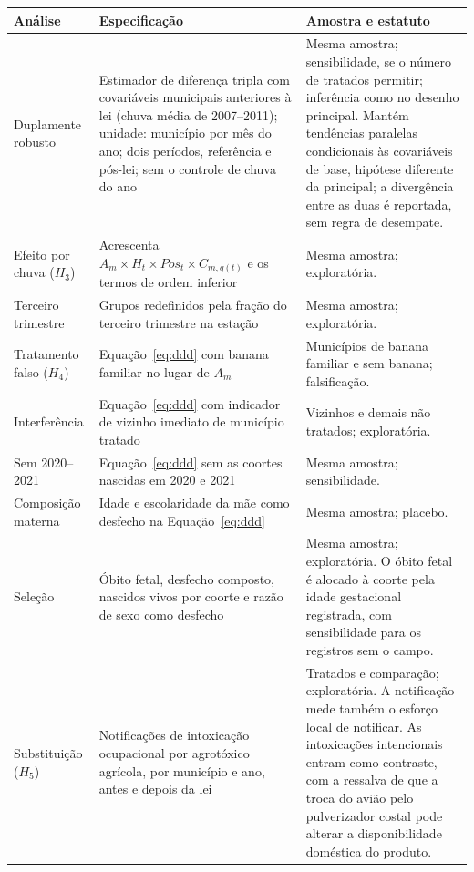 \begin{apendicesenv}
\begin{quadro}[htb]
\caption{\label{qua:espec2}Especificações do desenho de calendário (continuação)}
\centering
\footnotesize
\begin{tabular}{@{}p{3.4cm}p{6.0cm}p{5.1cm}@{}}
\toprule
Análise & Especificação & Amostra e estatuto \\
\midrule
Duplamente robusto & Estimador de diferença tripla com covariáveis municipais anteriores à lei (chuva média de 2007--2011); unidade: município por mês do ano; dois períodos, referência e pós-lei; sem o controle de chuva do ano & Mesma amostra; sensibilidade, se o número de tratados permitir; inferência como no desenho principal. Mantém tendências paralelas condicionais às covariáveis de base, hipótese diferente da principal; a divergência entre as duas é reportada, sem regra de desempate. \\
Efeito por chuva ($H_3$) & Acrescenta $A_m \times H_t \times Pos_t \times C_{m,q(t)}$ e os termos de ordem inferior & Mesma amostra; exploratória. \\
Terceiro trimestre & Grupos redefinidos pela fração do terceiro trimestre na estação & Mesma amostra; exploratória. \\
Tratamento falso ($H_4$) & Equação~\ref{eq:ddd} com banana familiar no lugar de $A_m$ & Municípios de banana familiar e sem banana; falsificação. \\
Interferência & Equação~\ref{eq:ddd} com indicador de vizinho imediato de município tratado & Vizinhos e demais não tratados; exploratória. \\
Sem 2020--2021 & Equação~\ref{eq:ddd} sem as coortes nascidas em 2020 e 2021 & Mesma amostra; sensibilidade. \\
Composição materna & Idade e escolaridade da mãe como desfecho na Equação~\ref{eq:ddd} & Mesma amostra; placebo. \\
Seleção & Óbito fetal, desfecho composto, nascidos vivos por coorte e razão de sexo como desfecho & Mesma amostra; exploratória. O óbito fetal é alocado à coorte pela idade gestacional registrada, com sensibilidade para os registros sem o campo. \\
Substituição ($H_5$) & Notificações de intoxicação ocupacional por agrotóxico agrícola, por município e ano, antes e depois da lei & Tratados e comparação; exploratória. A notificação mede também o esforço local de notificar. As intoxicações intencionais entram como contraste, com a ressalva de que a troca do avião pelo pulverizador costal pode alterar a disponibilidade doméstica do produto. \\
\bottomrule
\end{tabular}
\end{quadro}
\clearpage

\end{apendicesenv}
